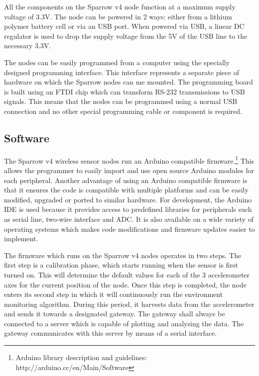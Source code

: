 All the components on the Sparrow v4 node function at a maximum supply voltage of 3.3V. The node can be powered in 2 ways: either from a lithium polymer battery 
cell or via an USB port. When powered via USB, a linear DC regulator is used to drop the supply voltage from the 5V of the USB line to the necessary 3.3V.

The nodes can be easily programmed from a computer using the specially designed programming interface. This interface represents a separate piece of hardware
on which the Sparrow nodes can me mounted. The programming board is built using an FTDI chip which can transform RS-232 transmissions to USB signals. This means 
that the nodes can be programmed using a normal USB connection and no other special programming cable or component is required.

\subsection{Software}

The Sparrow v4 wireless sensor nodes run an Arduino compatible firmware.\footnote{Arduino library description and guidelines: http://arduino.cc/en/Main/Software}
This allows the programmer to easily import 
and use open source Arduino modules for each peripheral. Another advantage of using an Arduino compatible firmware is that it ensures the code is 
compatible with multiple platforms and can be easily modified, upgraded or ported to similar hardware. For development, the Arduino IDE is used 
because it provides access to predefined libraries for peripherals such as serial line, two-wire interface and ADC. It is also available on a wide 
variety of operating systems which makes code modifications and firmware updates easier to implement.

The firmware which runs on the Sparrow v4 nodes operates in two steps. The first step is a calibration phase, which starts running when the sensor 
is first turned on. This will determine the default values for each of the 3 accelerometer axes for the current position of the node. Once this step 
is completed, the node enters its second step in which it will continuously run the environment monitoring algorithm. During this period, it harvests data 
from the accelerometer and sends it towards a designated gateway. The gateway shall always be connected to a server 
which is capable of plotting and analysing the data. The gateway communicates with this server by means of a serial interface.

